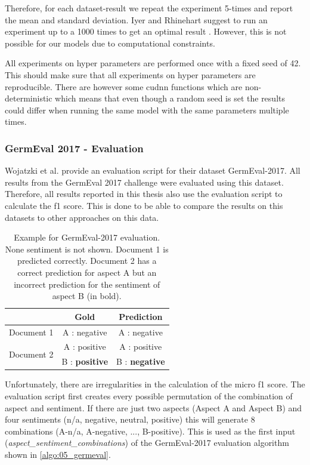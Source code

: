 Therefore, for each dataset-result we repeat the experiment 5-times and report the mean and standard deviation. Iyer and Rhinehart suggest to run an experiment up to a 1000 times to get an optimal result \cite{Iyer1999}. However, this is not possible for our models due to computational constraints.

All experiments on hyper parameters are performed once with a fixed seed of 42. This should make sure that all experiments on hyper parameters are reproducible. There are however some cudnn functions which are non-deterministic which means that even though a random seed is set the results could differ when running the same model with the same parameters multiple times.

\subsubsection*{GermEval 2017 - Evaluation}

Wojatzki et al. \cite{Wojatzki} provide an evaluation script for their dataset GermEval-2017. All results from the GermEval 2017 challenge were evaluated using this dataset. Therefore, all results reported in this thesis also use the evaluation script to calculate the f1 score. This is done to be able to compare the results on this datasets to other approaches on this data.

\begin{table}[hbt]
	\centering
	\label{tab:05_germevalEvaluationExample}
	\caption{Example for GermEval-2017 evaluation. None sentiment is not shown. Document 1 is predicted correctly. Document 2 has a correct prediction for aspect A but an incorrect prediction for the sentiment of aspect B {(in bold)}.}
	\begin{tabular}{@{}lcc}
		\toprule 
		& \textbf{Gold} & \textbf{Prediction} \\ 
		\hline 
		Document 1 & A : negative & A : negative \\ 
		\hline 
		\multirow{2}{*}{Document 2} & A : positive & A : positive \\ 
		& B : \textbf{positive} & B : \textbf{negative} \\ 
		\hline 
	\end{tabular}
\end{table}

Unfortunately, there are irregularities in the calculation of the micro f1 score. The evaluation script first creates every possible permutation of the combination of aspect and sentiment. If there are just two aspects {(Aspect A and Aspect B)} and four sentiments {(n/a, negative, neutral, positive)} this will generate 8 combinations {(A-n/a, A-negative, ..., B-positive)}. This is used as the first input {(\textit{aspect\_sentiment\_combinations})} of the GermEval-2017 evaluation algorithm shown in \ref{algo:05_germeval}.

